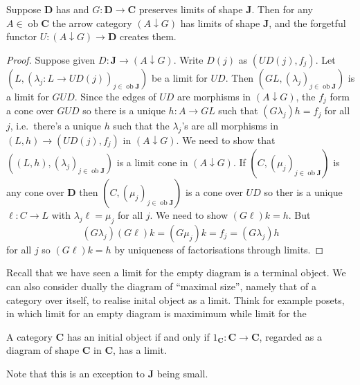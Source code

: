 \documentclass[a4paper]{article}
\renewcommand{\c}[1]{\mathbf{#1}}
\DeclareMathOperator{\ob}{ob}
\begin{document}
\begin{lemma}
  Suppose \(\c D\) has and \(G: \c D \to \c C\) preserves limits of shape \(\c J\). Then for any \(A \in \ob \c C\) the arrow category \((A \downarrow G)\) has limits of shape \(\c J\), and the forgetful functor \(U: (A \downarrow G) \to \c D\) creates them.
\end{lemma}

\begin{proof}
  Suppose given \(D: \c J \to (A \downarrow G)\). Write \(D(j)\) as \((UD(j), f_j)\). Let \((L, (\lambda_j: L \to UD(j))_{j \in \ob \c J})\) be a limit for \(UD\). Then \((GL, (\lambda_j)_{j \in \ob \c J})\) is a limit for \(GUD\). Since the edges of \(UD\) are morphisms in \((A \downarrow G)\), the \(f_j\) form a cone over \(GUD\) so there is a unique \(h: A \to GL\) such that \((G\lambda_j)h = f_j\) for all \(j\), i.e.\ there's a unique \(h\) such that the \(\lambda_j\)'s are all morphisms in \((L, h) \to (UD(j), f_j)\) in \((A \downarrow G)\). We need to show that \(((L, h), (\lambda_j)_{j \in \ob \c J})\) is a limit cone in \((A \downarrow G)\). If \((C, (\mu_j)_{j \in \ob \c J})\) is any cone over \(\c D\) then \((C, (\mu_j)_{j \in \ob \c J})\) is a cone over \(UD\) so ther is a unique \(\ell: C \to L\) with \(\lambda_j \ell = \mu_j\) for all \(j\). We need to show \((G\ell) k = h\). But
  \[
    (G\lambda_j) (G\ell) k = (G \mu_j)k = f_j = (G\lambda_j)h
  \]
  for all \(j\) so \((G\ell) k = h\) by uniqueness of factorisations through limits.
\end{proof}

Recall that we have seen a limit for the empty diagram is a terminal object. We can also consider dually the diagram of ``maximal size'', namely that of a category over itself, to realise inital object as a limit. Think for example posets, in which limit for an empty diagram is maximimum while limit for the

\begin{lemma}
  A category \(\c C\) has an initial object if and only if \(1_{\c C}: \c C \to \c C\), regarded as a diagram of shape \(\c C\) in \(\c C\), has a limit.
\end{lemma}

Note that this is an exception to \(\c J\) being small.

\end{document}
